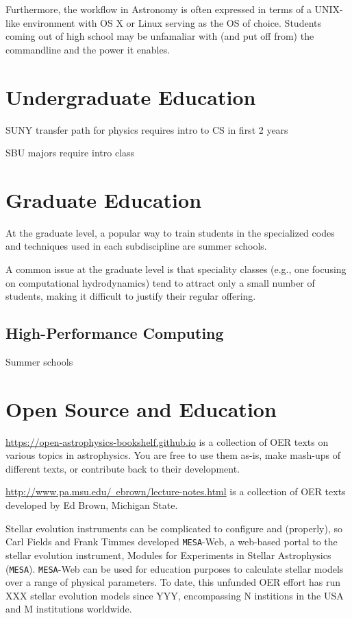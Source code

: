 \documentclass[11pt]{article}
\begin{document}
Furthermore, the workflow in Astronomy is often expressed in terms of
a UNIX-like environment with OS X or Linux serving as the OS of
choice.  Students coming out of high school may be unfamaliar with
(and put off from) the commandline and the power it enables.

\section{Undergraduate Education}

SUNY transfer path for physics requires intro to CS in first 2 years

 SBU majors require intro class



\section{Graduate Education}

At the graduate level, a popular way to train students in the specialized
codes and techniques used in each subdiscipline are summer schools.

A common issue at the graduate level is that speciality classes (e.g.,
one focusing on computational hydrodynamics) tend to attract only a
small number of students, making it difficult to justify their regular
offering.

\subsection{High-Performance Computing}

Summer schools


\section{Open Source and Education}

\href{https://open-astrophysics-bookshelf.github.io}{https://open-astrophysics-bookshelf.github.io}
is a collection of OER texts on various
topics in astrophysics. You are free to use them as-is, make mash-ups
of different texts, or contribute back to their development.

\href{http://www.pa.msu.edu/~ebrown/lecture-notes.html}{http://www.pa.msu.edu/~ebrown/lecture-notes.html}
is a collection of OER texts developed by Ed Brown, Michigan State.


Stellar evolution instruments can be complicated to configure and
(properly), so Carl Fields and Frank Timmes developed {\tt MESA}-Web,
a web-based portal to the stellar evolution instrument, Modules for
Experiments in Stellar Astrophysics ({\tt MESA}).  {\tt MESA}-Web can
be used for education purposes to calculate stellar models over a
range of physical parameters.  To date, this unfunded OER effort has
run XXX stellar evolution models since YYY, encompassing N institions
in the USA and M institutions worldwide.
\end{document}
